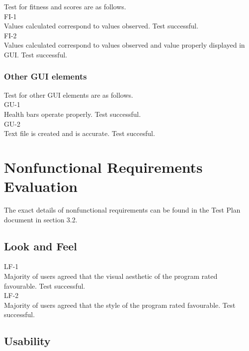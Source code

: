 \documentclass[12pt, titlepage]{article}
\begin{document}
Test for fitness and scores are as follows.\\

FI-1\\

Values calculated correspond to values observed. Test successful.\\

FI-2\\

Values calculated correspond to values observed and value properly displayed in GUI. Test successful.

\subsubsection{Other GUI elements}

Test for other GUI elements are as follows.\\

GU-1\\

Health bars operate properly. Test successful.\\

GU-2\\

Text file is created and is accurate. Test succesful.

\section{Nonfunctional Requirements Evaluation}

The exact details of nonfunctional requirements can be found in the Test Plan document in section 3.2.

\subsection{Look and Feel}

LF-1\\

Majority of users agreed that the visual aesthetic of the program rated favourable. Test successful.\\

LF-2\\

Majority of users agreed that the style of the program rated favourable. Test successful.

\subsection{Usability}
\end{document}
